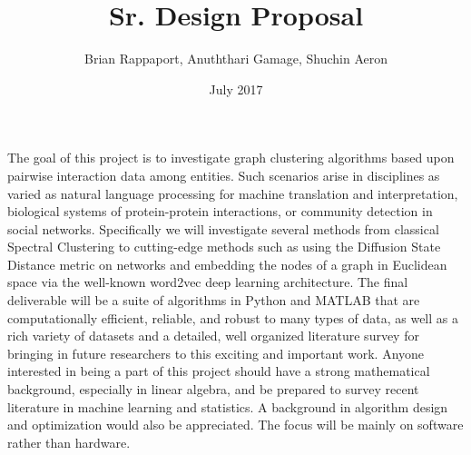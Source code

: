 \documentclass{article}
\title{Sr. Design Proposal}
\author{Brian Rappaport, Anuththari Gamage, Shuchin Aeron }
\date{July 2017}
\begin{document}
\maketitle

The goal of this project is to investigate graph clustering algorithms based upon pairwise interaction data among entities. Such scenarios arise in disciplines as varied as natural language processing for machine translation and interpretation, biological systems of protein-protein interactions, or community detection in social networks. Specifically we will investigate several methods from classical Spectral Clustering to cutting-edge methods such as using the Diffusion State Distance metric on networks and embedding the nodes of a graph in Euclidean space via the well-known word2vec deep learning architecture. The final deliverable will be a suite of algorithms in Python and MATLAB that are computationally efficient, reliable, and robust to many types of data, as well as a rich variety of datasets and a detailed, well organized literature survey for bringing in future researchers to this exciting and important work.
Anyone interested in being a part of this project should have a strong mathematical background, especially in linear algebra, and be prepared to survey recent literature in machine learning and statistics. A background in algorithm design and optimization would also be appreciated. The focus will be mainly on software rather than hardware.
\end{document}
